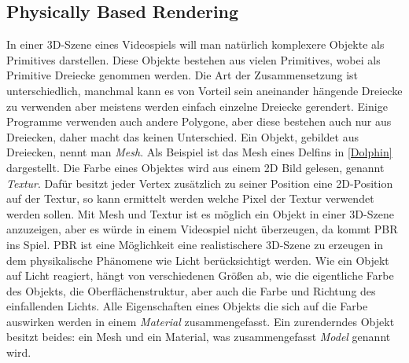 \subsection{Physically Based Rendering}

In einer 3D-Szene eines Videospiels will man natürlich komplexere Objekte als Primitives darstellen. Diese Objekte bestehen aus vielen Primitives, wobei als Primitive Dreiecke genommen werden. Die Art der Zusammensetzung ist unterschiedlich, manchmal kann es von Vorteil sein aneinander hängende Dreiecke zu verwenden aber meistens werden einfach einzelne Dreiecke gerendert. Einige Programme verwenden auch andere Polygone, aber diese bestehen auch nur aus Dreiecken, daher macht das keinen Unterschied. Ein Objekt, gebildet aus Dreiecken, nennt man \textit{Mesh}. Als Beispiel ist das Mesh eines Delfins in \cref{Dolphin} dargestellt. Die Farbe eines Objektes wird aus einem 2D Bild gelesen, genannt \textit{Textur}. Dafür besitzt jeder Vertex zusätzlich zu seiner Position eine 2D-Position auf der Textur, so kann ermittelt werden welche Pixel der Textur verwendet werden sollen. Mit Mesh und Textur ist es möglich ein Objekt in einer 3D-Szene anzuzeigen, aber es würde in einem Videospiel nicht überzeugen, da kommt \ac{PBR} ins Spiel. \ac{PBR} ist eine Möglichkeit eine realistischere 3D-Szene zu erzeugen in dem physikalische Phänomene wie Licht berücksichtigt werden. Wie ein Objekt auf Licht reagiert, hängt von verschiedenen Größen ab, wie die eigentliche Farbe des Objekts, die Oberflächenstruktur, aber auch die Farbe und Richtung des einfallenden Lichts. Alle Eigenschaften eines Objekts die sich auf die Farbe auswirken werden in einem \textit{Material} zusammengefasst. Ein zurenderndes  Objekt besitzt beides: ein Mesh und ein Material, was zusammengefasst \textit{Model} genannt wird.

